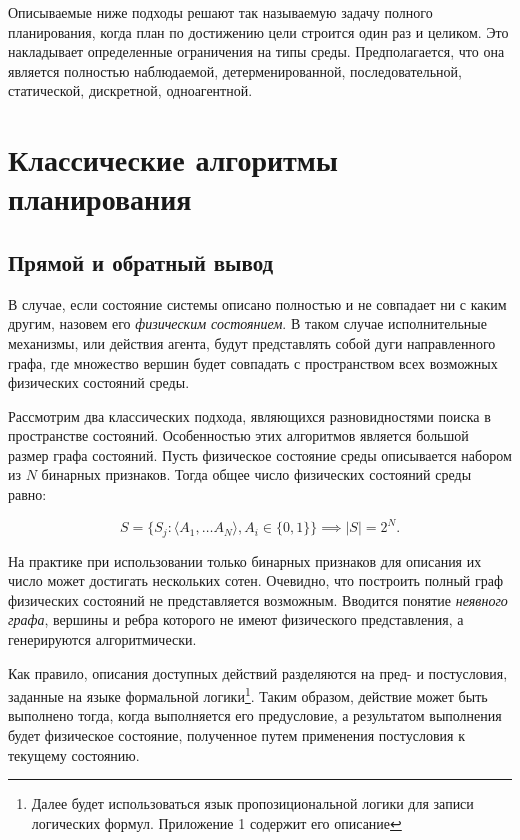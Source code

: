 Описываемые ниже подходы решают так называемую задачу полного планирования, когда план по достижению цели строится один раз и целиком. Это накладывает определенные ограничения на типы среды. Предполагается, что она является полностью наблюдаемой, детерменированной, последовательной, статической, дискретной, одноагентной.

\section{Классические алгоритмы планирования}

\subsection{Прямой и обратный вывод}

В случае, если состояние системы описано полностью и не совпадает ни с каким другим, назовем его 
\emph{физическим состоянием}. В таком случае исполнительные механизмы, или действия агента, будут представлять собой дуги направленного графа, где множество вершин будет совпадать с пространством всех возможных физических состояний среды.

Рассмотрим два классических подхода, являющихся разновидностями поиска в пространстве состояний. Особенностью этих алгоритмов является большой размер графа состояний. Пусть физическое состояние среды описывается набором из $N$ бинарных признаков. Тогда общее число физических состояний среды равно:

\begin{equation}
 S= \{ S_j: \langle A_1, \dots A_N \rangle, A_i \in \{0, 1\} \} \implies |S| = 2^N.
\end{equation}

На практике при использовании только бинарных признаков для описания их число может достигать нескольких сотен. Очевидно, что построить полный граф физических состояний не представляется возможным. Вводится понятие \emph{неявного графа}, вершины и ребра которого не имеют физического представления, а генерируются алгоритмически.

Как правило, описания доступных действий разделяются на пред- и постусловия, заданные на языке формальной логики\footnote{Далее будет использоваться язык пропозициональной логики для записи логических формул. Приложение 1 содержит его описание}. Таким образом, действие может быть выполнено тогда, когда выполняется его предусловие, а результатом выполнения будет физическое состояние, полученное путем применения постусловия к текущему состоянию.

